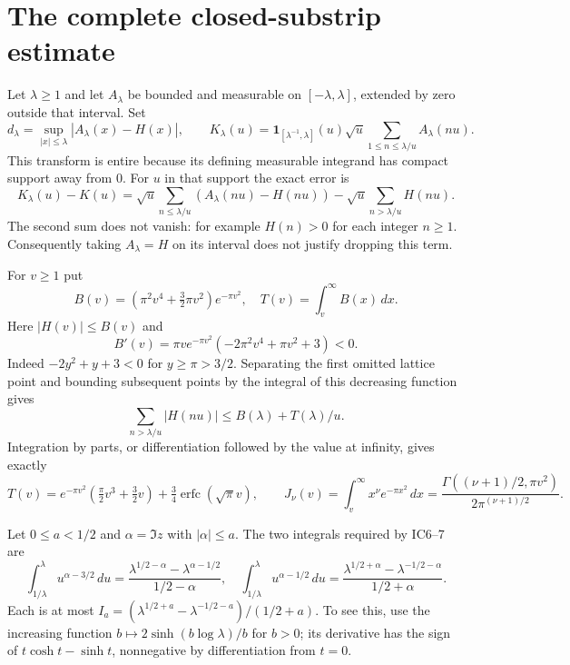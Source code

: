 \documentclass[11pt]{article}
\begin{document}
\section{The complete closed-substrip estimate}
Let $\lambda\ge1$ and let $A_\lambda$ be bounded and measurable
on $[-\lambda,\lambda]$, extended by zero outside that interval.
Set
\[
 d_\lambda=\sup_{|x|\le\lambda}|A_\lambda(x)-H(x)|,\qquad
 K_\lambda(u)=\mathbf1_{[\lambda^{-1},\lambda]}(u)\sqrt u
       \sum_{1\le n\le\lambda/u}A_\lambda(nu).
\]
This transform is entire because its defining measurable integrand
has compact support away from $0$.
For $u$ in that support the exact error is
\begin{equation}\tag{IC6}
 K_\lambda(u)-K(u)
 =\sqrt u\sum_{n\le\lambda/u}(A_\lambda(nu)-H(nu))
   -\sqrt u\sum_{n>\lambda/u}H(nu).
\end{equation}
The second sum does not vanish: for example $H(n)>0$ for each
integer $n\ge1$. Consequently taking $A_\lambda=H$ on its interval
does not justify dropping this term.

For $v\ge1$ put
\[
 B(v)=(\pi^2v^4+\tfrac32\pi v^2)e^{-\pi v^2},\quad
 T(v)=\int_v^\infty B(x)\,dx.
\]
Here $|H(v)|\le B(v)$ and
\[
 B'(v)=\pi v e^{-\pi v^2}(-2\pi^2v^4+\pi v^2+3)<0.
\]
Indeed $-2y^2+y+3<0$ for $y\ge\pi>3/2$.
Separating the first omitted lattice point and bounding subsequent
points by the integral of this decreasing function gives
\begin{equation}\tag{IC7}
 \sum_{n>\lambda/u}|H(nu)|\le B(\lambda)+T(\lambda)/u.
\end{equation}
Integration by parts, or differentiation followed by the value at
infinity, gives exactly
\begin{equation}\tag{IC8}
 T(v)=e^{-\pi v^2}(\tfrac\pi2v^3+\tfrac32v)
       +\tfrac34\operatorname{erfc}(\sqrt\pi v),\qquad
 J_\nu(v)=\int_v^\infty x^\nu e^{-\pi x^2}\,dx
 =\frac{\Gamma((\nu+1)/2,\pi v^2)}{2\pi^{(\nu+1)/2}}.
\end{equation}

Let $0\le a<1/2$ and $\alpha=\Im z$ with $|\alpha|\le a$.
The two integrals required by IC6--7 are
\[
 \int_{1/\lambda}^{\lambda}u^{\alpha-3/2}\,du
 =\frac{\lambda^{1/2-\alpha}-\lambda^{\alpha-1/2}}{1/2-\alpha},
 \quad
 \int_{1/\lambda}^{\lambda}u^{\alpha-1/2}\,du
 =\frac{\lambda^{1/2+\alpha}-\lambda^{-1/2-\alpha}}{1/2+\alpha}.
\]
Each is at most
$I_a=(\lambda^{1/2+a}-\lambda^{-1/2-a})/(1/2+a)$.
To see this, use the increasing function
$b\mapsto2\sinh(b\log\lambda)/b$ for $b>0$; its derivative
has the sign of $t\cosh t-\sinh t$, nonnegative by differentiation
from $t=0$.
\end{document}

